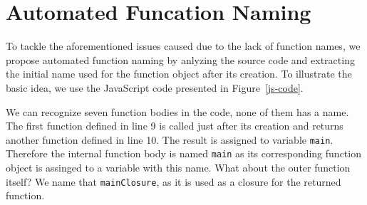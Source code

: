 \documentclass{acm_proc_article-sp}
\begin{document}
\section{Automated Funcation Naming}
    
    To tackle the aforementioned issues caused due to the lack of function names, we propose automated function naming by anlyzing the source code and extracting the initial name used for the function object after its creation. To illustrate the basic idea, we use the JavaScript code presented in Figure~\ref{js-code}. 
    
    We can recognize seven function bodies in the code, none of them has a name. The first function defined in line 9 is called just after its creation and returns another function defined in line 10. The result is assigned to variable {\small\texttt{main}}. Therefore the internal function body is named {\small\texttt{main}} as its corresponding function object is assinged to a variable with this name. What about the outer function itself? We name that
 {\small\texttt{mainClosure}}, as it is used as a closure for the returned function. 
 
 
 
    
\end{document}
